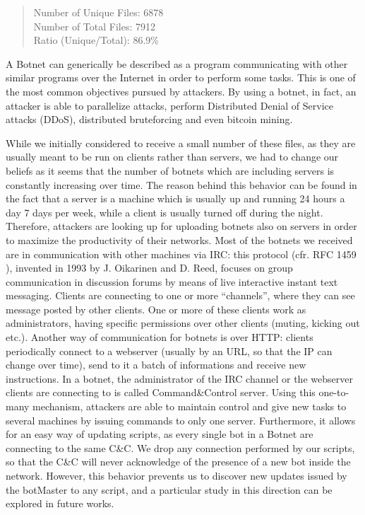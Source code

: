 \begin{quote}
Number of Unique Files: 6878\\
Number of Total Files: 7912\\
Ratio (Unique/Total): 86.9\%
\end{quote}

A Botnet can generically be described as a program communicating with other similar programs over the Internet in order to perform some tasks. This is one of the most common objectives pursued by attackers. By using a botnet, in fact, an attacker is able to parallelize attacks, perform Distributed Denial of Service attacks (DDoS), distributed bruteforcing and even bitcoin mining.

While we initially considered to receive a small number of these files, as they are usually meant to be run on clients rather than servers, we had to change our beliefs as it seems that the number of botnets which are including servers is constantly increasing over time. The reason behind this behavior can be found in the fact that a server is a machine which is usually up and running 24 hours a day 7 days per week, while a client is usually turned off during the night. Therefore, attackers are looking up for uploading botnets also on servers in order to maximize the productivity of their networks.
Most of the botnets we received are in communication with other machines via IRC: this protocol (cfr. RFC 1459 \cite{irc}), invented in 1993 by J. Oikarinen and D. Reed, focuses on group communication in discussion forums by means of live interactive instant text messaging. Clients are connecting to one or more ``channels'', where they can see message posted by other clients. One or more of these clients work as administrators, having specific permissions over other clients (muting, kicking out etc.).
Another way of communication for botnets is over HTTP: clients periodically connect to a webserver (usually by an URL, so that the IP can change over time), send to it a batch of informations and receive new instructions.
In a botnet, the administrator of the IRC channel or the webserver clients are connecting to is called Command\&Control server. Using this one-to-many mechanism, attackers are able to maintain control and give new tasks to several machines by issuing commands to only one server. Furthermore, it allows for an easy way of updating scripts, as every single bot in a Botnet are connecting to the same C\&C. We drop any connection performed by our scripts, so that the C\&C will never acknowledge of the presence of a new bot inside the network. However, this behavior prevents us to discover new updates issued by the botMaster to any script, and a particular study in this direction can be explored in future works.

